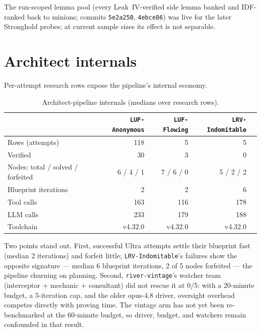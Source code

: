 \documentclass[12pt, a4paper]{article}
\newcommand{\run}[1]{\texttt{#1}}
\begin{document}
The run-scoped lemma pool (every Leak~IV-verified side lemma banked and
IDF-ranked back to minions; commits \run{5e2a250}, \run{4ebce86}) was live for
the later Stronghold probes; at current sample sizes its effect is not
separable.

\section{Architect internals}
\label{sec:architect}

Per-attempt research rows expose the pipeline's internal economy.

\begin{table}[H]
\centering\small
\caption{Architect-pipeline internals (medians over research rows).}
\label{tab:internals}
\begin{tabular}{@{}lrrrr@{}}
\toprule
 & \run{LUF-Anonymous} & \run{LUF-Flowing} & \run{LRV-Indomitable} \\
\midrule
Rows (attempts)        & 118 & 5 & 5 \\
Verified               & 30 & 3 & 0 \\
Nodes: total / solved / forfeited & 6 / 4 / 1 & 7 / 6 / 0 & 5 / 2 / 2 \\
Blueprint iterations   & 2 & 2 & 6 \\
Tool calls             & 163 & 116 & 178 \\
LLM calls              & 233 & 179 & 188 \\
Toolchain              & v4.32.0 & v4.32.0 & v4.32.0 \\
\bottomrule
\end{tabular}
\end{table}

Two points stand out. First, successful Ultra attempts settle their blueprint
fast (median 2 iterations) and forfeit little; \run{LRV-Indomitable}'s
failures show the opposite signature --- median 6 blueprint iterations, 2 of 5
nodes forfeited --- the pipeline churning on planning. Second,
\run{river-vintage}'s watcher team (interceptor + mechanic + consultant) did
not rescue it at 0/5: with a 20-minute budget, a 5-iteration cap, and the
older opus-4.8 driver, oversight overhead competes directly with proving time.
The vintage arm has not yet been re-benchmarked at the 60-minute budget, so
driver, budget, and watchers remain confounded in that result.

\end{document}
